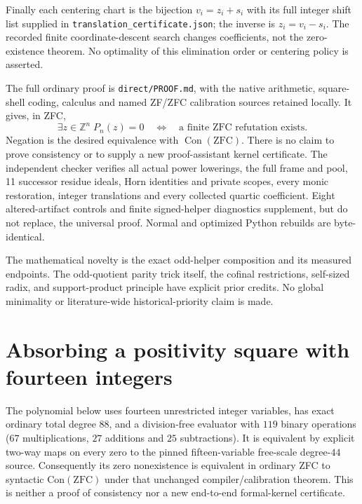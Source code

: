 \documentclass[11pt]{article}
\begin{document}
Finally each centering chart is the bijection
$v_i=z_i+s_i$ with its full integer shift list supplied in
\texttt{translation\_certificate.json}; the inverse is $z_i=v_i-s_i$.
The recorded finite coordinate-descent search changes coefficients, not
the zero-existence theorem. No optimality of this elimination order or
centering policy is asserted.

The full ordinary proof is \texttt{direct/PROOF.md}, with the native arithmetic,
square-shell coding, calculus and named ZF/ZFC calibration sources retained
locally. It gives, in ZFC,
\[
 \exists z\in\mathbb Z^n\;P_n(z)=0
 \quad\Longleftrightarrow\quad
 \text{a finite ZFC refutation exists}.
\]
Negation is the desired equivalence with $\operatorname{Con}(\mathrm{ZFC})$.
There is no claim to prove consistency or to supply a new proof-assistant
kernel certificate. The independent checker verifies all actual power
lowerings, the full frame and pool, 11 successor residue ideals, Horn
identities and private scopes, every monic restoration, integer translations
and every collected quartic coefficient. Eight altered-artifact controls and
finite signed-helper diagnostics supplement, but do not replace, the universal
proof. Normal and optimized Python rebuilds are byte-identical.

The mathematical novelty is the exact odd-helper composition and its measured
endpoints. The odd-quotient parity trick itself, the cofinal restrictions,
self-sized radix, and support-product principle have explicit prior credits.
No global minimality or literature-wide historical-priority claim is made.
\section{Absorbing a positivity square with fourteen integers}
\label{sec:positive-root14}
The polynomial below uses fourteen unrestricted integer variables, has exact
ordinary total degree $88$, and a division-free evaluator with $119$ binary
operations ($67$ multiplications, $27$ additions and $25$ subtractions).
It is equivalent by explicit two-way maps on every zero to the pinned
fifteen-variable free-scale degree-$44$ source. Consequently its zero
nonexistence is equivalent in ordinary ZFC to syntactic $\mathrm{Con}(\mathrm{ZFC})$
under that unchanged compiler/calibration theorem. This is neither a proof of
consistency nor a new end-to-end formal-kernel certificate.
\end{document}
